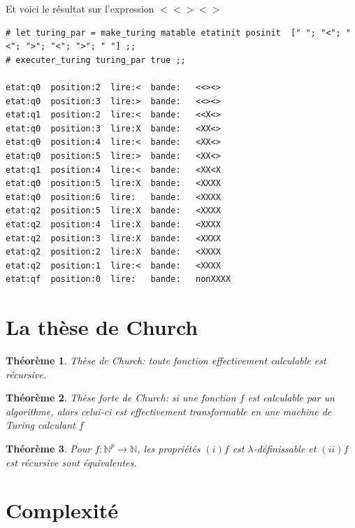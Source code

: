 \documentclass[11pt]{book}
\newtheorem{theoreme}{Théorème}
\begin{document}
Et voici le résultat sur l'expression $ <<><> $
\begin{Verbatim}
# let turing_par = make_turing matable etatinit posinit  [" "; "<"; "<"; ">"; "<"; ">"; " "] ;;
# executer_turing turing_par true ;;

etat:q0  position:2  lire:<  bande:   <<><> 
etat:q0  position:3  lire:>  bande:   <<><> 
etat:q1  position:2  lire:<  bande:   <<X<> 
etat:q0  position:3  lire:X  bande:   <XX<> 
etat:q0  position:4  lire:<  bande:   <XX<> 
etat:q0  position:5  lire:>  bande:   <XX<> 
etat:q1  position:4  lire:<  bande:   <XX<X 
etat:q0  position:5  lire:X  bande:   <XXXX 
etat:q0  position:6  lire:   bande:   <XXXX  
etat:q2  position:5  lire:X  bande:   <XXXX  
etat:q2  position:4  lire:X  bande:   <XXXX  
etat:q2  position:3  lire:X  bande:   <XXXX  
etat:q2  position:2  lire:X  bande:   <XXXX  
etat:q2  position:1  lire:<  bande:   <XXXX  
etat:qf  position:0  lire:   bande:   nonXXXX  
\end{Verbatim}
\section{La thèse de Church}
\begin{theoreme}
	Thèse de Church: toute fonction effectivement calculable est récursive.
\end{theoreme}
\begin{theoreme}
	Thèse forte de Church: si une fonction $f$ est calculable par un algorithme, 
	alors celui-ci est effectivement transformable en une machine de Turing 
	calculant $f$
\end{theoreme}
\begin{theoreme}
  Pour $f:\mathbb{N}^p \rightarrow \mathbb{N}$, les propriétés $(i) f$ est $\lambda$-définissable et 
  $(ii) f$ est récursive sont équivalentes.
\end{theoreme}

\section{Complexité}
\end{document}
